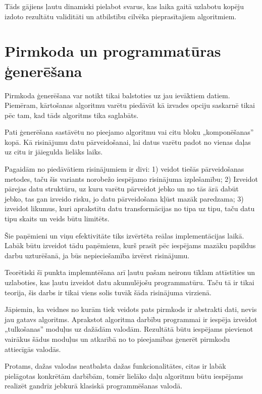 Tāds gājiens ļautu dinamiski pielabot svarus, kas laika gaitā uzlabotu kopēju izdoto rezultātu validitāti un atbilstību cilvēka pieprasītajiem algoritmiem.

\section{Pirmkoda un programmatūras ģenerēšana}
Pirmkoda ģenerēšana var notikt tikai balstoties uz jau ievāktiem datiem. Piemēram, kārtošanas algoritmu varētu piedāvāt kā izvades opciju saskarnē tikai pēc tam, kad tāds algoritms tika saglabāts.

Pati ģenerēšana sastāvētu no pieejamo algoritmu vai citu bloku „komponēšanas” kopā. Kā risinājumu datu pārveidošanai, lai datus varētu padot no vienas daļas uz citu ir jāiegulda lielāks laiks.

Pagaidām no piedāvātiem risinājumiem ir divi: 1) veidot tiešās pārveidošanas metodes, taču šis variants norobežo iespējamo risinājuma izplešamību; 2) Izveidot pārejas datu struktūru, uz kuru varētu pārveidot jebko un no tās ārā dabūt jebko, tas gan izveido risku, jo datu pārveidošana kļūst mazāk paredzama; 3) izveidot likumus, kuri aprakstītu datu transformācijas no tipa uz tipu, taču datu tipu skaits un veids būtu limitēts.

Šie paņēmieni un viņu efektivitāte tiks izvērtēta reālas implementācijas laikā. Labāk būtu izveidot tādu paņēmienu, kurš prasīt pēc iespējams mazāku papildus darbu uzturēšanā, ja būs nepieciešamība izvērst risinājumu.

Teorētiski šī punkta implemntēšana arī ļautu pašam neironu tīklam attīstīties un uzlaboties, kas ļautu izveidot datu akumulējošu programmatūru. Taču tā ir tikai teorija, šis darbs ir tikai viens solis tuvāk šāda risinājuma virzienā.

Jāpiemin, ka veidnes no kurām tiek veidots pats pirmkods ir abstrakti dati, nevis jau gatavs algoritms. Aprakstot algoritma darbību programmai ir iespēja izveidot „tulkošanas” moduļus uz dažādām valodām. Rezultātā būtu iespējams pievienot vairākus šādus moduļus un atkarībā no to pieejamības ģenerēt pirmkodu attiecīgās valodās.

Protams, dažas valodas neatbalsta dažas funkcionalitātes, citas ir labāk pielāgotas konkrētām darbībām, tomēr lielāko daļu algoritmu būtu iespējams realizēt gandrīz jebkurā klasiskā programmēšanas valodā.
